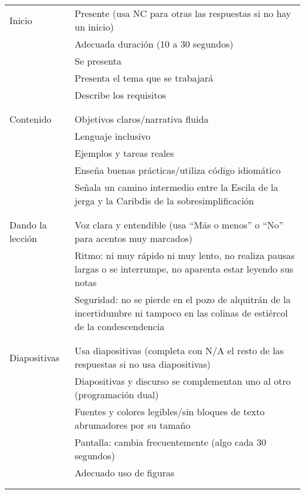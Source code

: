 \noindent
\begin{longtable}{p{}p{}}

  Inicio
  & Presente (usa NC para otras las respuestas si no hay un inicio) \\
  & Adecuada duración (10 a 30 segundos) \\
  & Se presenta \\
  & Presenta el tema que se trabajará \\
  & Describe los requisitos \\
  \\ [-1.5ex] \hline \\ [-1.5ex]

  Contenido
  & Objetivos claros/narrativa fluida \\
  & Lenguaje inclusivo \\
  & Ejemplos y tareas reales \\
  & Enseña buenas prácticas/utiliza código idiomático\\
  & Señala un camino intermedio entre la Escila de la jerga y la Caribdis de la sobresimplificación \\
  \\ [-1.5ex] \hline \\ [-1.5ex]

  Dando la lección
  & Voz clara y entendible (usa ``Más o menos'' o ``No'' para acentos muy marcados) \\
  & Ritmo: ni muy rápido ni muy lento, no realiza pausas largas o se interrumpe, no aparenta estar leyendo sus notas \\
  & Seguridad: no se pierde en el pozo de alquitrán de la incertidumbre ni tampoco en las colinas de estiércol de la condescendencia \\
  \\ [-1.5ex] \hline \\ [-1.5ex]

  Diapositivas
  & Usa diapositivas (completa con N/A el resto de las respuestas si no usa diapositivas) \\
  & Diapositivas y discurso se complementan uno al otro (programación dual) \\
  & Fuentes y colores legibles/sin bloques de texto abrumadores por su tamaño\\
  & Pantalla: cambia frecuentemente (algo cada 30 segundos) \\
  & Adecuado uso de figuras \\
  \\ [-1.5ex] \hline \\ [-1.5ex]


\end{longtable}
